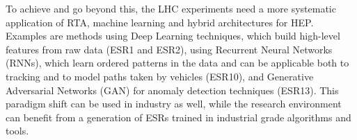 To achieve and go beyond this, the LHC experiments need a more systematic application of RTA, machine learning and hybrid architectures for HEP. Examples are methods using Deep Learning techniques, which build high-level features from raw data (ESR1 and ESR2), using Recurrent Neural Networks (RNNs), which learn ordered patterns in the data and can be applicable both to tracking and to model paths taken by vehicles (ESR10), and Generative Adversarial Networks (GAN) for anomaly detection techniques (ESR13).
This paradigm shift can be used in industry as well, while the research environment can benefit from a generation of ESRs trained in industrial grade algorithms and tools. 


